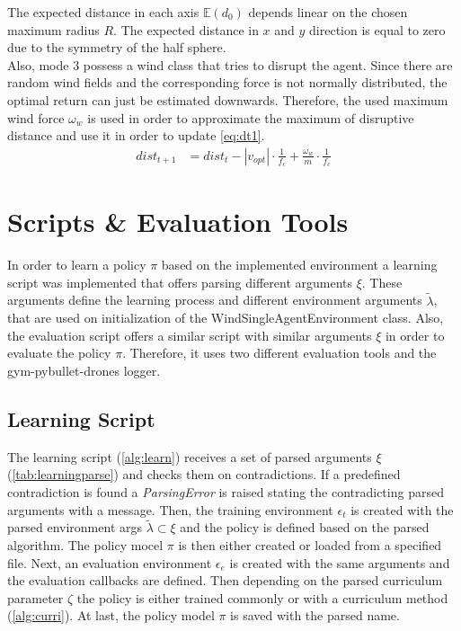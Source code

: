 The expected distance in each axis $\mathbb{E}(d_0)$ depends linear on the chosen maximum radius $R$. 
The expected distance in $x$ and $y$ direction is equal to zero due to the symmetry of the half sphere.\\
Also, mode 3 possess a wind class that tries to disrupt the agent. Since there are random wind fields and the corresponding 
force is not normally distributed, the optimal return can just be estimated downwards. 
Therefore, the used maximum wind force $\omega_w$ is used in order to approximate the maximum of disruptive distance and use it in order to update \cref{eq:dt1}.
\begin{align}
	dist_{t+1} &= dist_t - | v_{opt} | \cdot \frac{1}{f_c} + \frac{\omega_w}{m} \cdot \frac{1}{f_c}
\end{align}
\newpage



\newpage

\section{Scripts \& Evaluation Tools} \label{sec:scripts}
In order to learn a policy $\pi$ based on the implemented environment a learning script was implemented that offers parsing different arguments $\xi$. 
These arguments define the learning process and different environment arguments $\tilde{\lambda}$, that are used on initialization of the WindSingleAgentEnvironment class.
Also, the evaluation script offers a similar script with similar arguments $\xi$ in order to evaluate the policy $\pi$.
Therefore, it uses two different evaluation tools and the gym-pybullet-drones logger. 


\subsection{Learning Script}
The learning script (\cref{alg:learn}) receives a set of parsed arguments $\xi$ (\cref{tab:learningparse}) and checks them on contradictions. 
If a predefined contradiction is found a \emph{ParsingError} is raised stating the contradicting parsed arguments with a message.
Then, the training environment $\epsilon_t$ is created with the parsed environment args $\tilde{\lambda} \subset \xi$ and the policy 
is defined based on the parsed algorithm. The policy mocel $\pi$ is then either created or loaded from a specified file. 
Next, an evaluation environment $\epsilon_e$ is created with the same arguments and the evaluation callbacks are defined. 
Then depending on the parsed curriculum parameter $\zeta$ the policy is either trained commonly or with a curriculum method (\cref{alg:curri}).
At last, the policy model $\pi$ is saved with the parsed name.

